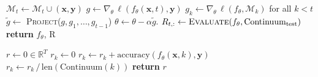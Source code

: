\begin{enumerate}[label={},wide,labelwidth=!,itemindent=!,labelindent=0pt]
\begin{algorithm}
\begin{minipage}[t]{.5\linewidth}
\begin{algorithmic}
                \State $\mathcal{M}_t \leftarrow \mathcal{M}_t \cup (\boldsymbol{x},\boldsymbol{y})$
                \State $g \leftarrow \nabla_\theta \, \ell (f_\theta(\boldsymbol{x}, t), \boldsymbol{y})$
                \State $g_{k} \leftarrow \nabla_\theta \, \ell (f_\theta, \mathcal{M}_{k})$ for all
                    $k < t$ 
                \State $\tilde{g} \leftarrow$ \textsc{Project}($g, g_1, \ldots, g_{t-1}$)
                \State $\theta \leftarrow \theta - \alpha \tilde{g}$.
            \EndFor
            \State $R_{t,:} \leftarrow \textsc{Evaluate}(f_\theta, \text{Continuum}_{\text{test}})$
            \EndFor
            \State \textbf{return} $f_\theta$, R
        \EndProcedure
        \end{algorithmic}
        \end{minipage}
        \hfill
        \begin{minipage}[t]{.45\linewidth}
        \begin{algorithmic}
        \small
            \State $r \leftarrow 0 \in \mathbb{R}^T$
            \State $r_k \leftarrow 0$
                \State $r_k \leftarrow r_k +  \mbox{accuracy}(f_\theta(\boldsymbol{x}, k), \boldsymbol{y})$
            \EndFor
            \State $r_k \leftarrow r_k \,/\, \text{len}(\text{Continuum}(k))$
            \EndFor
            \State \textbf{return} $r$
        \EndProcedure
        \end{algorithmic}
        \end{minipage}
    \end{algorithm}
\end{enumerate}